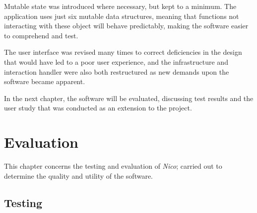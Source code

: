 \documentclass[12pt,twoside,notitlepage,xetex]{report}
\begin{document}
{Mutable state was introduced where necessary, but kept to a minimum.  The application uses just six mutable data structures, meaning that functions not interacting with these object will behave predictably, making the software easier to comprehend and test.

The user interface was revised many times to correct deficiencies in the design that would have led to a poor user experience, and the infrastructure and interaction handler were also both restructured as new demands upon the software became apparent.

In the next chapter, the software will be evaluated, discussing test results and the user study that was conducted as an extension to the project.

\cleardoublepage
\chapter{Evaluation}

This chapter concerns the testing and evaluation of \emph{Nico}; carried out to determine the quality and utility of the software.

\section{Testing}%


}
\end{document}
